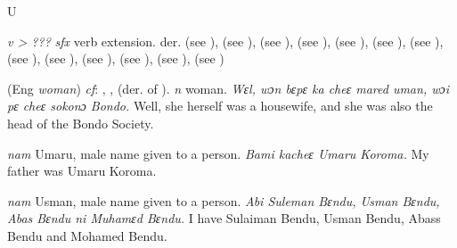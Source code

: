\begin{letter}{U}

 \textit{v > ???} \textit{sfx} verb extension. der.  (see ),  (see ),  (see ),  (see ),  (see ),  (see ),  (see ),  (see ),  (see ),  (see ),  (see ),  (see ),  (see )

 (Eng \textit{woman}) \textit{cf}: , ,  (der. of ). \textit{n} woman. \textit{Wɛl, wɔn bɛpɛ ka cheɛ mared uman, wɔi pɛ cheɛ sokonɔ Bondo.} Well, she herself was a housewife, and she was also the head of the Bondo Society.

 \textit{nam} Umaru, male name given to a person. \textit{Bami kacheɛ Umaru Koroma.} My father was Umaru Koroma.

 \textit{nam} Usman, male name given to a person. \textit{Abi Suleman Bɛndu, Usman Bɛndu, Abas Bɛndu ni Muhamɛd Bɛndu.} I have Sulaiman Bendu, Usman Bendu, Abass Bendu and Mohamed Bendu.

\end{letter}
